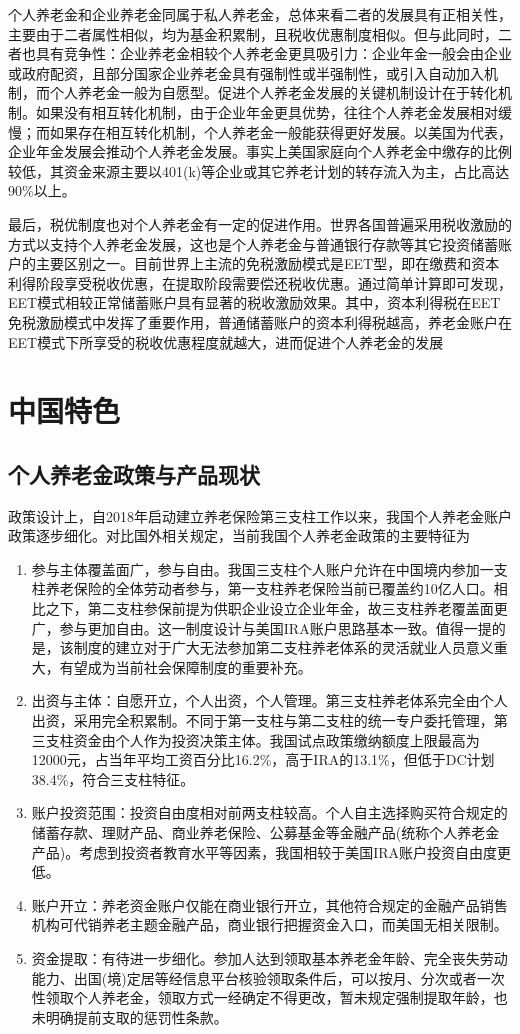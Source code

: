 \documentclass[a4paper,10.5pt]{ctexart}
\begin{document}
个人养老金和企业养老金同属于私人养老金，总体来看二者的发展具有正相关性，主要由于二者属性相似，均为基金积累制，且税收优惠制度相似。但与此同时，二者也具有竞争性：企业养老金相较个人养老金更具吸引力：企业年金一般会由企业或政府配资，且部分国家企业养老金具有强制性或半强制性，或引入自动加入机制，而个人养老金一般为自愿型。促进个人养老金发展的关键机制设计在于转化机制。如果没有相互转化机制，由于企业年金更具优势，往往个人养老金发展相对缓慢；而如果存在相互转化机制，个人养老金一般能获得更好发展。以美国为代表，企业年金发展会推动个人养老金发展。事实上美国家庭向个人养老金中缴存的比例较低，其资金来源主要以401(k)等企业或其它养老计划的转存流入为主，占比高达90\%以上。

最后，税优制度也对个人养老金有一定的促进作用。世界各国普遍采用税收激励的方式以支持个人养老金发展，这也是个人养老金与普通银行存款等其它投资储蓄账户的主要区别之一。目前世界上主流的免税激励模式是EET型，即在缴费和资本利得阶段享受税收优惠，在提取阶段需要偿还税收优惠。通过简单计算即可发现，EET模式相较正常储蓄账户具有显著的税收激励效果。其中，资本利得税在EET免税激励模式中发挥了重要作用，普通储蓄账户的资本利得税越高，养老金账户在EET模式下所享受的税收优惠程度就越大，进而促进个人养老金的发展

\section{中国特色}
\subsection{个人养老金政策与产品现状}
政策设计上，自2018年启动建立养老保险第三支柱工作以来，我国个人养老金账户政策逐步细化。对比国外相关规定，当前我国个人养老金政策的主要特征为
\begin{enumerate}
    \item 参与主体覆盖面广，参与自由。我国三支柱个人账户允许在中国境内参加一支柱养老保险的全体劳动者参与，第一支柱养老保险当前已覆盖约10亿人口。相比之下，第二支柱参保前提为供职企业设立企业年金，故三支柱养老覆盖面更广，参与更加自由。这一制度设计与美国IRA账户思路基本一致。值得一提的是，该制度的建立对于广大无法参加第二支柱养老体系的灵活就业人员意义重大，有望成为当前社会保障制度的重要补充。
    \item 出资与主体：自愿开立，个人出资，个人管理。第三支柱养老体系完全由个人出资，采用完全积累制。不同于第一支柱与第二支柱的统一专户委托管理，第三支柱资金由个人作为投资决策主体。我国试点政策缴纳额度上限最高为12000元，占当年平均工资百分比16.2\%，高于IRA的13.1\%，但低于DC计划38.4\%，符合三支柱特征。
    \item 账户投资范围：投资自由度相对前两支柱较高。个人自主选择购买符合规定的储蓄存款、理财产品、商业养老保险、公募基金等金融产品(统称个人养老金产品)。考虑到投资者教育水平等因素，我国相较于美国IRA账户投资自由度更低。
    \item 账户开立：养老资金账户仅能在商业银行开立，其他符合规定的金融产品销售机构可代销养老主题金融产品，商业银行把握资金入口，而美国无相关限制。
    \item 资金提取：有待进一步细化。参加人达到领取基本养老金年龄、完全丧失劳动能力、出国(境)定居等经信息平台核验领取条件后，可以按月、分次或者一次性领取个人养老金，领取方式一经确定不得更改，暂未规定强制提取年龄，也未明确提前支取的惩罚性条款。
\end{enumerate}
\end{document}

